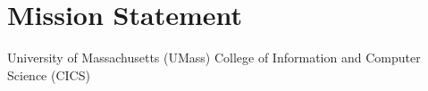 \section{Mission Statement}
\label{sec:mission}
University of Massachusetts (UMass)
College of Information and Computer Science (CICS)